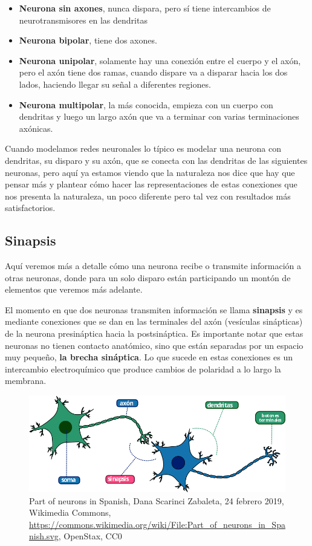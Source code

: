 \begin{itemize}
\item \textbf{Neurona sin axones}, nunca dispara, pero sí tiene intercambios de neurotransmisores en las dendritas 
\item \textbf{Neurona bipolar}, tiene dos axones. 
\item \textbf{Neurona unipolar}, solamente hay una conexión entre el cuerpo y el axón, pero el axón tiene dos ramas, cuando dispare va a disparar hacia los dos lados, haciendo llegar su señal a diferentes regiones. 
\item \textbf{Neurona multipolar}, la más conocida, empieza con un cuerpo con dendritas y luego un largo axón que va a terminar con varias terminaciones axónicas. 
\end{itemize}


Cuando modelamos redes neuronales lo típico es modelar una neurona con dendritas, su disparo y su axón, que se conecta con las dendritas de las siguientes neuronas, pero aquí ya estamos viendo que la naturaleza nos dice que hay que pensar más y plantear cómo hacer las representaciones de estas conexiones que nos presenta la naturaleza, un poco diferente pero tal vez con resultados más satisfactorios.




\subsection{Sinapsis}


Aquí veremos más a detalle cómo una neurona recibe o transmite información a otras neuronas, donde para un solo disparo están participando un montón de elementos que veremos más adelante.


 El momento en que dos neuronas transmiten información se llama \textbf{sinapsis} y es mediante conexiones que se dan en las terminales del axón (vesículas sinápticas) de la neurona presináptica hacia la postsináptica. Es importante notar que estas neuronas no tienen contacto anatómico, sino que están separadas por un espacio muy pequeño, \textbf{la brecha sináptica}. Lo que sucede en estas conexiones es un intercambio electroquímico que produce cambios de polaridad a lo largo la membrana. 




\begin{figure}[h]
 \centering
 \includegraphics[scale=0.5]{../Figuras/Part_of_neurons_in_Spanish.png}
 \caption{Part of neurons in Spanish, Dana Scarinci Zabaleta, 24 febrero 2019, Wikimedia Commons, \url{https://commons.wikimedia.org/wiki/File:Part_of_neurons_in_Spanish.svg}, OpenStax, CC0}
 \label{fig:sinapsisN}
\end{figure}


